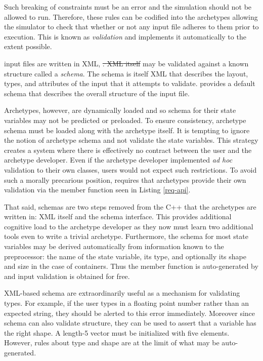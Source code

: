 Such breaking of constraints must be an error and the simulation should not be 
allowed to run. Therefore, these rules can be codified into the archetypes allowing 
the simulator to check that whether or not any input file adheres to them prior
to execution. This is known as \emph{validation} and \cyclus implements it 
automatically to the extent possible. 

\Cyclus input files are written in \gls{XML}, \sout{. \gls{XML} itself}   may be validated against a 
known structure called a \emph{schema}. The schema is itself \gls{XML} that describes 
the layout, types, and attributes of the input that it attempts to validate.
\Cyclus provides a default schema that describes the overall structure of the 
input file.

Archetypes, however, are dynamically loaded and so schema for their state 
variables may not be predicted or preloaded. To ensure consistency, archetype schema 
must be loaded along with the archetype itself.  It is tempting to ignore the 
notion of archetype schema and not validate the state variables.
This strategy creates a system where there is effectively no contract between the 
user and the archetype developer. Even if the archetype developer implemented 
\emph{ad hoc} validation to their own classes, users would not expect such 
restrictions.  To avoid such a morally precarious position, \cyclus requires
that archetypes provide their own validation via the  member 
function seen in Listing \ref{req-api}.

That said, schemas are two steps removed from the C++ that the archetypes
are written in: \gls{XML} itself and the schema interface. This provides additional 
cognitive load to the archetype developer as they now must learn two additional
tools even to write a trivial archetype. Furthermore, the schema for most state
variables may be derived automatically from information known to the preprocessor:
the name of the state variable, its type, and optionally its shape and size in 
the case of containers. Thus the  member function is auto-generated
by \cycpp and input validation is obtained for free. 

\gls{XML}-based schema are extraordinarily useful as a mechanism for validating types. 
For example, if the user types in a floating point number rather than an 
expected string, they should be alerted to this error immediately.
Moreover since schema can also validate structure, they can be used to assert that 
a variable has the right shape. A length-5 vector must be initialized with 
five elements. However, rules about type and shape are at the limit of what may 
be auto-generated.

